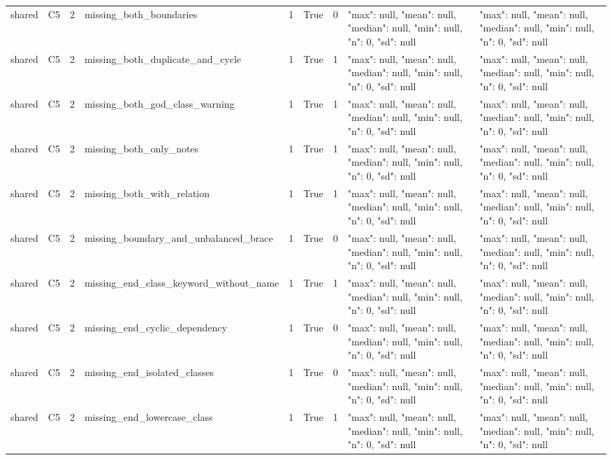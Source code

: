 \begin{tabular}{lllllllll}
shared & C5 & 2 & missing\_both\_boundaries & 1 & True & 0 & {"max": null, "mean": null, "median": null, "min": null, "n": 0, "sd": null} & {"max": null, "mean": null, "median": null, "min": null, "n": 0, "sd": null} \\
shared & C5 & 2 & missing\_both\_duplicate\_and\_cycle & 1 & True & 1 & {"max": null, "mean": null, "median": null, "min": null, "n": 0, "sd": null} & {"max": null, "mean": null, "median": null, "min": null, "n": 0, "sd": null} \\
shared & C5 & 2 & missing\_both\_god\_class\_warning & 1 & True & 1 & {"max": null, "mean": null, "median": null, "min": null, "n": 0, "sd": null} & {"max": null, "mean": null, "median": null, "min": null, "n": 0, "sd": null} \\
shared & C5 & 2 & missing\_both\_only\_notes & 1 & True & 1 & {"max": null, "mean": null, "median": null, "min": null, "n": 0, "sd": null} & {"max": null, "mean": null, "median": null, "min": null, "n": 0, "sd": null} \\
shared & C5 & 2 & missing\_both\_with\_relation & 1 & True & 1 & {"max": null, "mean": null, "median": null, "min": null, "n": 0, "sd": null} & {"max": null, "mean": null, "median": null, "min": null, "n": 0, "sd": null} \\
shared & C5 & 2 & missing\_boundary\_and\_unbalanced\_brace & 1 & True & 0 & {"max": null, "mean": null, "median": null, "min": null, "n": 0, "sd": null} & {"max": null, "mean": null, "median": null, "min": null, "n": 0, "sd": null} \\
shared & C5 & 2 & missing\_end\_class\_keyword\_without\_name & 1 & True & 1 & {"max": null, "mean": null, "median": null, "min": null, "n": 0, "sd": null} & {"max": null, "mean": null, "median": null, "min": null, "n": 0, "sd": null} \\
shared & C5 & 2 & missing\_end\_cyclic\_dependency & 1 & True & 0 & {"max": null, "mean": null, "median": null, "min": null, "n": 0, "sd": null} & {"max": null, "mean": null, "median": null, "min": null, "n": 0, "sd": null} \\
shared & C5 & 2 & missing\_end\_isolated\_classes & 1 & True & 0 & {"max": null, "mean": null, "median": null, "min": null, "n": 0, "sd": null} & {"max": null, "mean": null, "median": null, "min": null, "n": 0, "sd": null} \\
shared & C5 & 2 & missing\_end\_lowercase\_class & 1 & True & 1 & {"max": null, "mean": null, "median": null, "min": null, "n": 0, "sd": null} & {"max": null, "mean": null, "median": null, "min": null, "n": 0, "sd": null} \\

\end{tabular}
